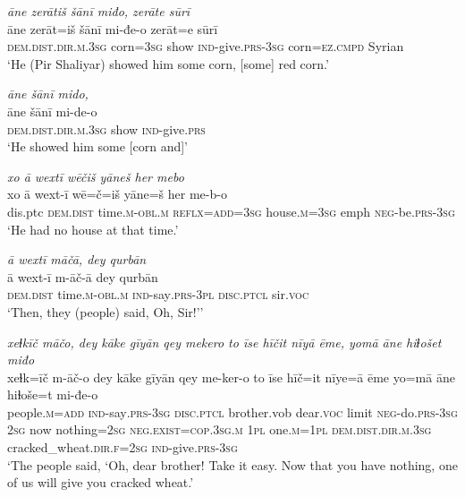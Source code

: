 \ea \label{ŽP.215}
\textit{āne zerātiš šānī miđo, zerāte sūrī} \\ 
\gll āne zerāt=iš šānī mi-đe-o zerāt=e sūrī \\ 
 \textsc{dem.dist}\textsc{.dir}\textsc{.m}\textsc{.3sg} corn\textsc{=3sg} show \textsc{ind-}give\textsc{.prs}\textsc{-3sg} corn\textsc{=ez}\textsc{.cmpd} Syrian \\ 
\glt `He (Pir Shaliyar) showed him some corn, [some] red corn.'
\z 
 
\ea \label{ŽP.216}
\textit{āne šānī mido,} \\ 
\gll āne šānī mi-de-o \\ 
 \textsc{dem.dist}\textsc{.dir}\textsc{.m}\textsc{.3sg} show \textsc{ind-}give\textsc{.prs} \\ 
\glt `He showed him some [corn and]'
\z 
 
\ea \label{ŽP.219}
\textit{xo ā wextī wēčiš yāneš her mebo} \\ 
\gll xo ā wext-ī wē=č=iš yāne=š her me-b-o \\ 
 dis.ptc \textsc{dem.dist} time\textsc{.m}\textsc{-obl}\textsc{.m} \textsc{reflx}\textsc{=add}\textsc{=3sg} house\textsc{.m}\textsc{=3sg} emph \textsc{neg-}be\textsc{.prs}\textsc{-3sg} \\ 
\glt `He had no house at that time.'
\z 
 
\ea \label{ŽP.220}
\textit{ā wextī māčā, dey qurbān} \\ 
\gll ā wext-ī m-āč-ā dey qurbān \\ 
 \textsc{dem.dist} time\textsc{.m}\textsc{-obl}\textsc{.m} \textsc{ind-}say\textsc{.prs}\textsc{-3pl} \textsc{disc.ptcl} sir.\textsc{voc} \\ 
\glt `Then, they (people) said, Oh, Sir!’'
\z 
 
\ea \label{ŽP.227}
\textit{xeɫkīč māčo, dey kāke gīyān qey mekero to īse hīčit nīyā ēme, yomā āne hiɫošet miđo} \\ 
\gll xeɫk=īč m-āč-o dey kāke gīyān qey me-ker-o to īse hīč=it nīye=ā ēme yo=mā āne hiɫoše=t mi-đe-o \\ 
 people\textsc{.m}\textsc{=add} \textsc{ind-}say\textsc{.prs}\textsc{-3sg} \textsc{disc.ptcl} brother.vob dear.\textsc{voc} limit \textsc{neg-}do\textsc{.prs}\textsc{-3sg} \textsc{2sg} now nothing\textsc{=\textsc{2sg}} \textsc{\textsc{neg.}exist}\textsc{=cop}\textsc{.3sg}\textsc{.m} \textsc{1pl} one\textsc{.m}\textsc{=1pl} \textsc{dem.dist}\textsc{.dir}\textsc{.m}\textsc{.3sg} cracked\_wheat\textsc{.dir}\textsc{.f}\textsc{=\textsc{2sg}} \textsc{ind-}give\textsc{.prs}\textsc{-3sg} \\ 
\glt `The people said, ‘Oh, dear brother! Take it easy. Now that you have nothing, one of us will give you cracked wheat.'
\z 
 
